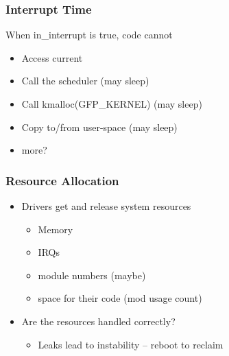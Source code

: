 % 
\begin{frame}[fragile]
    \frametitle{Interrupt Time}
When in_interrupt is true, code cannot
    \begin{itemize}
        \item Access current
        \item Call the scheduler (may sleep)
        \item Call kmalloc(GFP_KERNEL) (may sleep)
        \item Copy to/from user-space (may sleep)
        \item more?
    \end{itemize}
\end{frame}
% 
% 
\begin{frame}[fragile]
    \frametitle{Resource Allocation}
    \begin{itemize}
        \item Drivers get and release system resources
        \begin{itemize}
            \item Memory
            \item IRQs
            \item module numbers (maybe)
            \item space for their code (mod usage count)
        \end{itemize}
        \item Are the resources handled correctly?
        \begin{itemize}
            \item Leaks lead to instability -- reboot to reclaim
        \end{itemize}
    \end{itemize}
\end{frame}
% 

